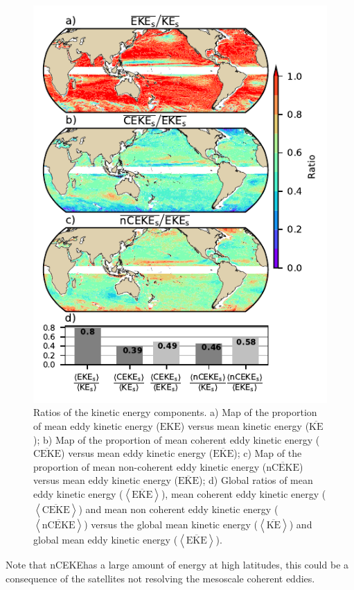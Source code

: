 \documentclass[draft,linenumbers]{agujournal2019}
\newcommand{\MKE}{\overline{\textrm{KE}}}
\newcommand{\MEKE}{\overline{\textrm{EKE}}}
\newcommand{\EKE}{\textrm{EKE}}
\newcommand{\MCEKE}{\overline{\textrm{CEKE}}}
\newcommand{\MnCEKE}{\overline{\textrm{nCEKE}}}
\newcommand{\nCEKE}{\textrm{nCEKE}}
\begin{document}
	\begin{figure}
	    \centering
	    \includegraphics[width=1\textwidth]{figures/eke_ratio_map_all.pdf}
	    \caption{Ratios of the kinetic energy components. a) Map of the proportion of mean eddy kinetic energy ($\EKE$) versus mean kinetic energy ($\MKE$);
		b) Map of the proportion of mean coherent eddy kinetic energy ($\MCEKE$) versus mean eddy kinetic energy ($\MEKE$);
		c) Map of the proportion of mean non-coherent eddy kinetic energy ($\MnCEKE$) versus mean eddy kinetic energy ($\MEKE$);
		d) Global ratios of mean eddy kinetic energy ($\left<\MEKE\right>$), mean coherent eddy kinetic energy ($\left<\MCEKE\right>$) and mean non coherent eddy kinetic energy ($\left<\MnCEKE\right>$) versus the global mean kinetic energy ($\left<\MKE\right>$) and global mean eddy kinetic energy ($\left<\MEKE\right>$).
		}
	    \label{fig:eddy_ratio}
	\end{figure}

	Note that \nCEKE has a large amount of energy at high latitudes, this could be a consequence of the satellites not resolving the mesoscale coherent eddies. 
\end{document}

